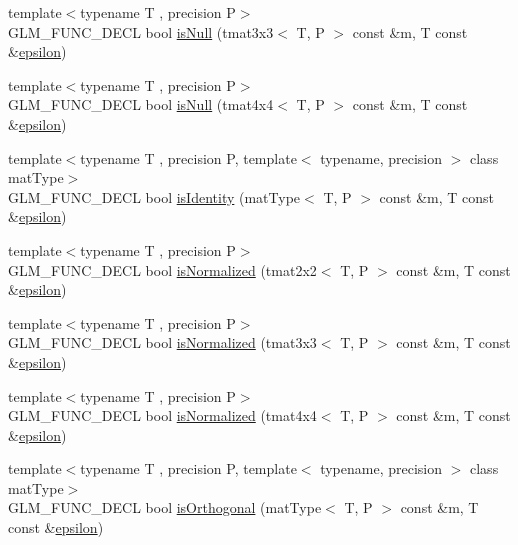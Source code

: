 \begin{DoxyCompactItemize}
\item 
{\footnotesize template$<$typename T , precision P$>$ }\\G\+L\+M\+\_\+\+F\+U\+N\+C\+\_\+\+D\+E\+C\+L bool \hyperlink{group__gtx__matrix__query_gac67a5c7e029a84b74b02ac9599b8972d}{is\+Null} (tmat3x3$<$ T, P $>$ const \&m, T const \&\hyperlink{group__gtc__constants_ga2a1e57fc5592b69cfae84174cbfc9429}{epsilon})
\item 
{\footnotesize template$<$typename T , precision P$>$ }\\G\+L\+M\+\_\+\+F\+U\+N\+C\+\_\+\+D\+E\+C\+L bool \hyperlink{group__gtx__matrix__query_ga326de496972051413c7b44b85fc9cb6e}{is\+Null} (tmat4x4$<$ T, P $>$ const \&m, T const \&\hyperlink{group__gtc__constants_ga2a1e57fc5592b69cfae84174cbfc9429}{epsilon})
\item 
{\footnotesize template$<$typename T , precision P, template$<$ typename, precision $>$ class mat\+Type$>$ }\\G\+L\+M\+\_\+\+F\+U\+N\+C\+\_\+\+D\+E\+C\+L bool \hyperlink{group__gtx__matrix__query_gafc1ce12c738b8c5d007179e615609330}{is\+Identity} (mat\+Type$<$ T, P $>$ const \&m, T const \&\hyperlink{group__gtc__constants_ga2a1e57fc5592b69cfae84174cbfc9429}{epsilon})
\item 
{\footnotesize template$<$typename T , precision P$>$ }\\G\+L\+M\+\_\+\+F\+U\+N\+C\+\_\+\+D\+E\+C\+L bool \hyperlink{group__gtx__matrix__query_ga11a8d5cdb36496b85f61e4f5f7f2602c}{is\+Normalized} (tmat2x2$<$ T, P $>$ const \&m, T const \&\hyperlink{group__gtc__constants_ga2a1e57fc5592b69cfae84174cbfc9429}{epsilon})
\item 
{\footnotesize template$<$typename T , precision P$>$ }\\G\+L\+M\+\_\+\+F\+U\+N\+C\+\_\+\+D\+E\+C\+L bool \hyperlink{group__gtx__matrix__query_ga351bcc8d485d329b78cfa875e084964d}{is\+Normalized} (tmat3x3$<$ T, P $>$ const \&m, T const \&\hyperlink{group__gtc__constants_ga2a1e57fc5592b69cfae84174cbfc9429}{epsilon})
\item 
{\footnotesize template$<$typename T , precision P$>$ }\\G\+L\+M\+\_\+\+F\+U\+N\+C\+\_\+\+D\+E\+C\+L bool \hyperlink{group__gtx__matrix__query_ga934b673ec0e16d79eca0ca9dbb5d6d8b}{is\+Normalized} (tmat4x4$<$ T, P $>$ const \&m, T const \&\hyperlink{group__gtc__constants_ga2a1e57fc5592b69cfae84174cbfc9429}{epsilon})
\item 
{\footnotesize template$<$typename T , precision P, template$<$ typename, precision $>$ class mat\+Type$>$ }\\G\+L\+M\+\_\+\+F\+U\+N\+C\+\_\+\+D\+E\+C\+L bool \hyperlink{group__gtx__matrix__query_gab2cb5d23df77b4e4e63ad2965acd31b3}{is\+Orthogonal} (mat\+Type$<$ T, P $>$ const \&m, T const \&\hyperlink{group__gtc__constants_ga2a1e57fc5592b69cfae84174cbfc9429}{epsilon})

\end{DoxyCompactItemize}

